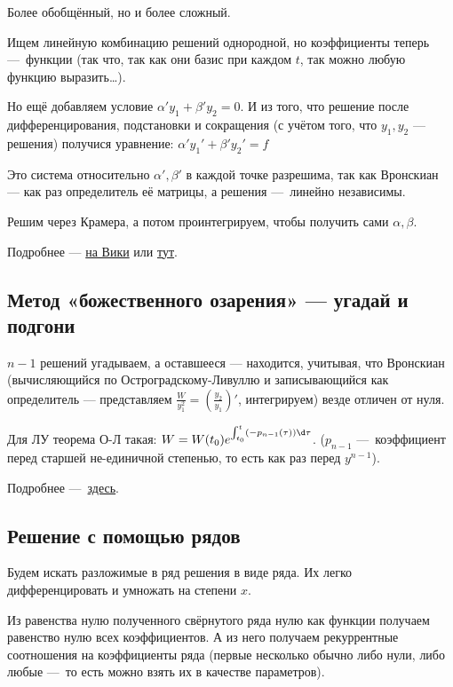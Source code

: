 \documentclass[12pt, a4paper]{article}
\begin{document}
Более обобщённый, но и более сложный.

Ищем линейную комбинацию решений однородной, но коэффициенты теперь — функции (так что, так как они базис при каждом $t$, так можно любую функцию выразить…).

Но ещё добавляем условие $\alpha' y_1 + \beta' y_2 = 0$.
И из того, что решение после дифференцирования, подстановки и сокращения (с учётом того, что $y_1, y_2$ — решения) 
получися уравнение: $\alpha' y_1' + \beta' y_2' = f$

Это система относительно $\alpha', \beta'$ в каждой точке разрешима, так как Вронскиан — как раз определитель её матрицы, а решения — линейно независимы.

Решим через Крамера, а потом проинтегрируем, чтобы получить сами $\alpha, \beta$.

Подробнее — \href{https://en.wikipedia.org/wiki/Variation_of_parameters}{на Вики} 
или \href{https://tutorial.math.lamar.edu/classes/de/VariationofParameters.aspx}{тут}.

\subsection{Метод «божественного озарения» — угадай и подгони}

$n - 1$ решений угадываем, а оставшееся — находится, учитывая, 
что Вронскиан (вычисляющийся по Остроградскому-Ливуллю 
и записывающийся как определитель — 
представляем $\frac{W}{y_1^2} = \left(\frac{y_2}{y_1}\right)'$, интегрируем)
везде отличен от нуля.

Для ЛУ теорема О-Л такая: $W = W(t_0) e^{\int_{t_0}^t (-p_{n-1}(\tau)) \d \tau}$. ($p_{n - 1}$ — коэффициент перед старшей не-единичной степенью, то есть как раз перед $y^{n - 1}$).

Подробнее — \href{https://ru.wikipedia.org/wiki/%D0%A4%D0%BE%D1%80%D0%BC%D1%83%D0%BB%D0%B0_%D0%9B%D0%B8%D1%83%D0%B2%D0%B8%D0%BB%D0%BB%D1%8F_%E2%80%94_%D0%9E%D1%81%D1%82%D1%80%D0%BE%D0%B3%D1%80%D0%B0%D0%B4%D1%81%D0%BA%D0%BE%D0%B3%D0%BE}{здесь}.


\subsection{Решение с помощью рядов}

Будем искать разложимые в ряд решения в виде ряда.
Их легко дифференцировать и умножать на степени $x$.

Из равенства нулю полученного свёрнутого ряда нулю как функции 
получаем равенство нулю всех коэффициентов. 
А из него получаем рекуррентные соотношения на коэффициенты ряда 
(первые несколько обычно либо нули, 
либо любые — то есть можно взять их в качестве параметров).
\end{document}
